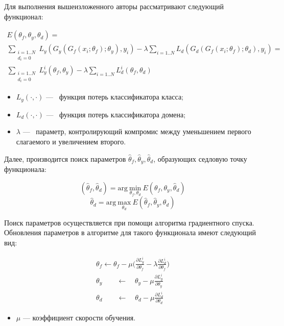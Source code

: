 \documentclass[14pt, a4paper]{extarticle}
\begin{document}
Для выполнения вышеизложенного авторы \cite{ganin} рассматривают следующий функционал:

\begin{equation*}
\begin{gathered}
E(\theta_f, \theta_y, \theta_d) = \\ \sum_{ \substack{i=1..N \\ d_i=0} }L_y(G_y(G_f(x_i; \theta_f); \theta_y), y_i) - \lambda \sum_{ i=1..N } L_d(G_d(G_f(x_i; \theta_f); \theta_d), y_i) = \\\sum_{ \substack{i=1..N \\ d_i=0} } L_y^i(\theta_f, \theta_y) - \lambda \sum_{ i=1..N }  L_d^i(\theta_f, \theta_d)
\end{gathered}
\end{equation*}
\begin{itemize}
\item $L_y(·, ·)$ —~ функция потерь классификатора класса;
\item $L_d(·, ·)$ —~ функция потерь классификатора домена;
\item $\lambda$ —~ параметр, контролирующий компромис между уменьшением первого слагаемого и увеличением второго.
\end{itemize}

Далее, производится поиск параметров $\hat \theta_f, \hat \theta_y, \hat \theta_d$, образующих седловую точку функционала:

\begin{equation*}
	(\hat \theta_f, \hat \theta_d) = \text{arg}~\underset{\theta_f, \theta_d}{\text{min}}~E(\theta_f, \theta_y, \hat \theta_d)
\end{equation*}
\begin{equation*}
	\hat \theta_d = \text{arg}~\underset{\theta_d}{\text{max}}~E(\hat \theta_f, \hat \theta_y, \theta_d)
\end{equation*}

Поиск параметров осуществляется при помощи алгоритма градиентного спуска. Обновления параметров в алгоритме для такого функционала имеют следующий вид:

\begin{equation*}
\begin{split}
	\theta_f \leftarrow \theta_f - \mu \Bigg( \frac{\partial L^i_y}{\partial \theta_f} - \lambda \frac{\partial L^i_d}{\partial \theta_f} \Bigg) \\
	\theta_y \quad \quad \leftarrow \quad \theta_y - \mu \frac{\partial L^i_y}{\partial \theta_y} \\
	\theta_d \quad \quad \leftarrow \quad \theta_d - \mu \frac{\partial L^i_d}{\partial \theta_d} 
\end{split}
\end{equation*}
\begin{itemize}
	\item $\mu$ — коэффициент скорости обучения.
\end{itemize}
\end{document}
